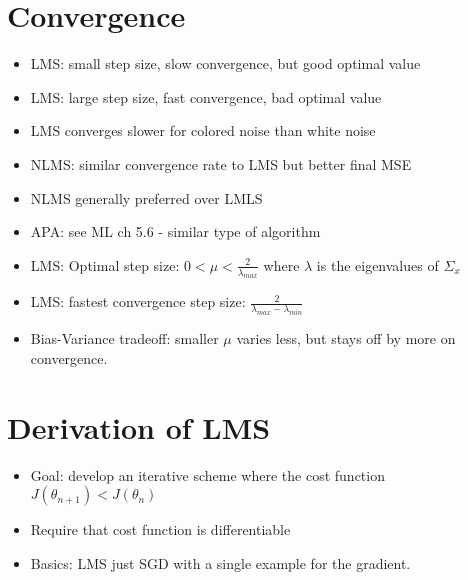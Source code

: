 \documentclass[12pt, letter]{article}
\begin{document}
	 \section{Convergence}%
	 \label{sec:convergence}
	 \begin{itemize}
	 \item LMS: small step size, slow convergence, but good optimal value
	 \item LMS: large step size, fast convergence, bad optimal value
	 \item LMS converges slower for colored noise than white noise 
	 \item NLMS: similar convergence rate to LMS but better final MSE
	 \item NLMS generally preferred over LMLS
	 \item APA: see ML ch 5.6 - similar type of algorithm
	 \item LMS: Optimal step size: $0 < \mu < \frac{2}{\lambda_{max}}$ where $\lambda$ is the eigenvalues of $\Sigma_x$ 
	 \item LMS: fastest convergence step size: $\frac{2}{\lambda_{max}-\lambda_{min}}$
	  \item Bias-Variance tradeoff: smaller $\mu$ varies less, but stays off by more on convergence.
	 \end{itemize}

	 \section{Derivation of LMS}%
	 \label{sec:derivation_of_lms}
	 \begin{itemize}
	 \item Goal: develop an iterative scheme where the cost function $J(\theta_{n+1}) < J(\theta_n)$
	 \item Require that cost function is differentiable
	 \item Basics: LMS just SGD with a single example for the gradient.
	 \end{itemize}


	 
\end{document}
